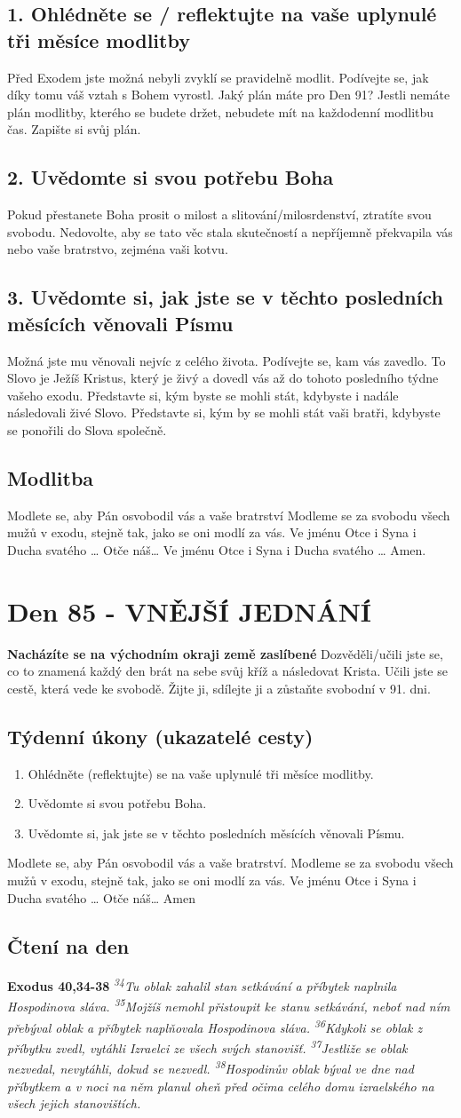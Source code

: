 \documentclass[11pt]{article}
\newcommand{\zacatekTrinactyTyden}{
\textbf{Nacházíte se na východním okraji země zaslíbené} \newline 
Dozvěděli/učili jste se, co to znamená každý den brát na sebe svůj kříž a následovat Krista. Učili jste se cestě, která vede ke svobodě. Žijte ji, sdílejte ji a zůstaňte svobodní v 91. dni.

\subsection*{Týdenní úkony (ukazatelé cesty)}
\begin{enumerate}
  \item Ohlédněte (reflektujte) se na vaše uplynulé tři měsíce modlitby.
  \item Uvědomte si svou potřebu Boha.
  \item Uvědomte si, jak jste se v těchto posledních měsících věnovali Písmu.
\end{enumerate}
Modlete se, aby Pán osvobodil vás a vaše bratrství. \newline
Modleme se za svobodu všech mužů v exodu, stejně tak, jako se oni modlí za vás.\newline
Ve jménu Otce i Syna i Ducha svatého …  Otče náš… Amen
}
\begin{document}
\subsection*{1. Ohlédněte se / reflektujte na vaše uplynulé tři měsíce modlitby}
Před Exodem jste možná nebyli zvyklí se pravidelně modlit. Podívejte se, jak díky tomu váš vztah s Bohem vyrostl. Jaký plán máte pro Den 91? Jestli nemáte plán modlitby, kterého se budete držet, nebudete mít na každodenní modlitbu čas. Zapište si svůj plán.
\subsection*{2. Uvědomte si svou potřebu Boha}
Pokud přestanete Boha prosit o milost a slitování/milosrdenství, ztratíte svou svobodu. Nedovolte, aby se tato věc stala skutečností a nepříjemně překvapila vás nebo vaše bratrstvo, zejména vaši kotvu.
\subsection*{3. Uvědomte si, jak jste se v těchto posledních měsících věnovali Písmu}
Možná jste mu věnovali nejvíc z celého života. Podívejte se, kam vás zavedlo. To Slovo je Ježíš Kristus, který je živý a dovedl vás až do tohoto posledního týdne vašeho exodu. Představte si, kým byste se mohli stát, kdybyste i nadále následovali živé Slovo. Představte si, kým by se mohli stát vaši bratři, kdybyste se ponořili do Slova společně.

\subsection*{Modlitba}
Modlete se, aby Pán osvobodil vás a vaše bratrství \newline
Modleme se za svobodu všech mužů v exodu, stejně tak, jako se oni modlí za vás.\newline
Ve jménu Otce i Syna i Ducha svatého … Otče náš… Ve jménu Otce i Syna i Ducha svatého … Amen.
\newpage

\newpage
\section{Den 85 - VNĚJŠÍ JEDNÁNÍ}
\zacatekTrinactyTyden
\subsection*{Čtení na den}
\textbf{Exodus 40,34-38}
\newline
\textit{
\textsuperscript{34}Tu oblak zahalil stan setkávání a příbytek naplnila Hospodinova sláva.
\textsuperscript{35}Mojžíš nemohl přistoupit ke stanu setkávání, neboť nad ním přebýval oblak a příbytek naplňovala Hospodinova sláva.
\textsuperscript{36}Kdykoli se oblak z příbytku zvedl, vytáhli Izraelci ze všech svých stanovišť.
\textsuperscript{37}Jestliže se oblak nezvedal, nevytáhli, dokud se nezvedl.
\textsuperscript{38}Hospodinův oblak býval ve dne nad příbytkem a v noci na něm planul oheň před očima celého domu izraelského na všech jejich stanovištích.
}
\end{document}
